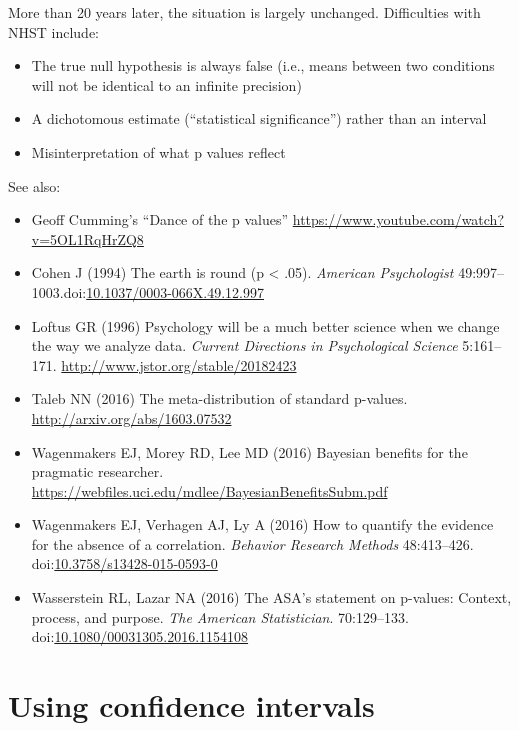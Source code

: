 \documentclass[letterpaper,oneside,11pt,article, portrait]{memoir}
\newcommand{\doi}[1]{doi:\href{http://dx.doi.org/#1}{#1}}
\newcommand{\journal}[1]{\textit{#1}} 			%
\begin{document}
\noindent More than 20 years later, the situation is largely unchanged. Difficulties with NHST include:

\begin{itemize}
\item The true null hypothesis is always false (i.e., means between two conditions will not be identical to an infinite precision)
\item A dichotomous estimate (``statistical significance'') rather than an interval
\item Misinterpretation of what p values reflect
\end{itemize}

\vspace{1em} \noindent See also:

\begin{itemize}

\item Geoff Cumming's ``Dance of the p values'' \url{https://www.youtube.com/watch?v=5OL1RqHrZQ8}
\item Cohen J (1994) The earth is round (p < .05). \journal{American Psychologist} 49:997--1003.\newline \doi{10.1037/0003-066X.49.12.997}
\item Loftus GR (1996) Psychology will be a much better science when we change the way we analyze data. \journal{Current Directions in Psychological Science} 5:161--171. \url{ http://www.jstor.org/stable/20182423}
\item Taleb NN (2016) The meta-distribution of standard p-values. \url{http://arxiv.org/abs/1603.07532}
\item Wagenmakers EJ, Morey RD, Lee MD (2016) Bayesian benefits for the pragmatic researcher. \url{https://webfiles.uci.edu/mdlee/BayesianBenefitsSubm.pdf}
\item Wagenmakers EJ, Verhagen AJ, Ly A (2016) How to quantify the evidence for the absence of a correlation. \journal{Behavior Research Methods} 48:413--426. \doi{10.3758/s13428-015-0593-0}
\item Wasserstein RL, Lazar NA (2016) The ASA's statement on p-values: Context, process, and purpose. \journal{The American Statistician}. 70:129--133. \doi{10.1080/00031305.2016.1154108}

\end{itemize}


\chapter{Using confidence intervals} \label{CI}
\end{document}
